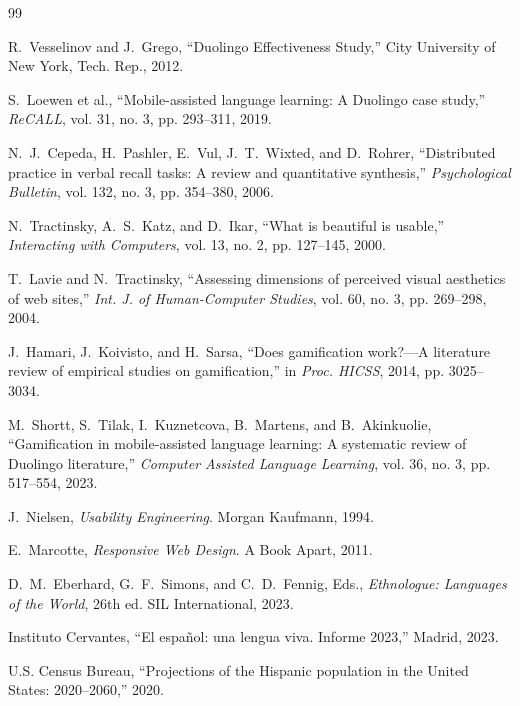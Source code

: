 \documentclass[11pt,a4paper]{article}
\begin{document}
\begin{thebibliography}{99}

R.~Vesselinov and J.~Grego, ``Duolingo Effectiveness Study,'' City University of New York, Tech. Rep., 2012.

S.~Loewen et al., ``Mobile-assisted language learning: A Duolingo case study,'' \emph{ReCALL}, vol. 31, no. 3, pp. 293--311, 2019.

N.~J.~Cepeda, H.~Pashler, E.~Vul, J.~T.~Wixted, and D.~Rohrer, ``Distributed practice in verbal recall tasks: A review and quantitative synthesis,'' \emph{Psychological Bulletin}, vol. 132, no. 3, pp. 354--380, 2006.

N.~Tractinsky, A.~S.~Katz, and D.~Ikar, ``What is beautiful is usable,'' \emph{Interacting with Computers}, vol. 13, no. 2, pp. 127--145, 2000.

T.~Lavie and N.~Tractinsky, ``Assessing dimensions of perceived visual aesthetics of web sites,'' \emph{Int. J. of Human-Computer Studies}, vol. 60, no. 3, pp. 269--298, 2004.

J.~Hamari, J.~Koivisto, and H.~Sarsa, ``Does gamification work?---A literature review of empirical studies on gamification,'' in \emph{Proc. HICSS}, 2014, pp. 3025--3034.

M.~Shortt, S.~Tilak, I.~Kuznetcova, B.~Martens, and B.~Akinkuolie, ``Gamification in mobile-assisted language learning: A systematic review of Duolingo literature,'' \emph{Computer Assisted Language Learning}, vol. 36, no. 3, pp. 517--554, 2023.

J.~Nielsen, \emph{Usability Engineering}. Morgan Kaufmann, 1994.

E.~Marcotte, \emph{Responsive Web Design}. A Book Apart, 2011.

D.~M.~Eberhard, G.~F.~Simons, and C.~D.~Fennig, Eds., \emph{Ethnologue: Languages of the World}, 26th ed. SIL International, 2023.

Instituto Cervantes, ``El español: una lengua viva. Informe 2023,'' Madrid, 2023.

U.S. Census Bureau, ``Projections of the Hispanic population in the United States: 2020--2060,'' 2020.


\end{thebibliography}
\end{document}
